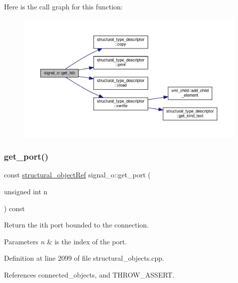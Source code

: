 Here is the call graph for this function\+:
\nopagebreak
\begin{figure}[H]
\begin{center}
\leavevmode
\includegraphics[width=350pt]{db/d5c/classsignal__o_a7f74d2fd1067b338fbf0d8c404af1114_cgraph}
\end{center}
\end{figure}
\mbox{\label{classsignal__o_a34f5a745bbc0a08d7178396abe2637dd}} 
\subsubsection{\texorpdfstring{get\+\_\+port()}{get\_port()}\hspace{0.1cm}{\footnotesize\ttfamily [1/2]}}
{\footnotesize\ttfamily const \hyperlink{structural__objects_8hpp_a8ea5f8cc50ab8f4c31e2751074ff60b2}{structural\+\_\+object\+Ref} signal\+\_\+o\+::get\+\_\+port (\begin{DoxyParamCaption}\item[{unsigned int}]{n }\end{DoxyParamCaption}) const}



Return the ith port bounded to the connection. 


\begin{DoxyParams}{Parameters}
{\em n} & is the index of the port. \\
\hline
\end{DoxyParams}


Definition at line 2099 of file structural\+\_\+objects.\+cpp.



References connected\+\_\+objects, and T\+H\+R\+O\+W\+\_\+\+A\+S\+S\+E\+RT.

